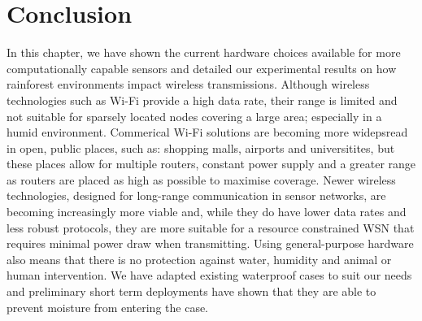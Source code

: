 \section{Conclusion}\label{tech:conc}
	In this chapter, we have shown the current hardware choices available for more computationally capable sensors and detailed our experimental results on how rainforest environments impact wireless transmissions. Although wireless technologies such as Wi-Fi provide a high data rate, their range is limited and not suitable for sparsely located nodes covering a large area; especially in a humid environment. Commerical Wi-Fi solutions are becoming more widepsread in open, public places, such as: shopping malls, airports and universitites, but these places allow for multiple routers, constant power supply and a greater range as routers are placed as high as possible to maximise coverage.
	Newer wireless technologies, designed for long-range communication in sensor networks, are becoming increasingly more viable and, while they do have lower data rates and less robust protocols, they are more suitable for a resource constrained WSN that requires minimal power draw when transmitting. 
	Using general-purpose hardware also means that there is no protection against water, humidity and animal or human intervention. We have adapted existing waterproof cases to suit our needs and preliminary short term deployments have shown that they are able to prevent moisture from entering the case.
	 
